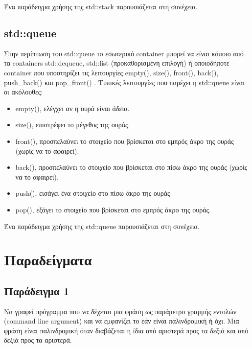 Ένα παράδειγμα χρήσης της std::stack παρουσιάζεται στη συνέχεια.






\subsection{std::queue}
Στην περίπτωση του std::queue το εσωτερικό container μπορεί να είναι κάποιο από τα containers std::dequeue, std::list (προκαθορισμένη επιλογή) ή οποιοδήποτε container που υποστηρίζει τις λειτουργίες empty(), size(), front(), back(), push\_back() και pop\_front() \cite{scobey_stl_queue}. Τυπικές λειτουργίες που παρέχει η std::queue είναι οι ακόλουθες:
\begin{itemize}[noitemsep]
\item empty(), ελέγχει αν η ουρά είναι άδεια.
\item size(), επιστρέφει το μέγεθος της ουράς.
\item front(), προσπελαύνει το στοιχείο που βρίσκεται στο εμπρός άκρο της ουράς (χωρίς να το αφαιρεί).
\item back(), προσπελαύνει το στοιχείο που βρίσκεται στο πίσω άκρο της ουράς (χωρίς να το αφαιρεί).
\item push(), εισάγει ένα στοιχείο στο πίσω άκρο της ουράς
\item pop(), εξάγει το στοιχείο που βρίσκεται στο εμπρός άκρο της ουράς.
\end{itemize}

Ένα παράδειγμα χρήσης της std::queue παρουσιάζεται στη συνέχεια.




\section{Παραδείγματα}
\subsection{Παράδειγμα 1}
Να γραφεί πρόγραμμα που να δέχεται μια φράση ως παράμετρο γραμμής εντολών (command line argument) και να εμφανίζει το εάν είναι παλινδρομική ή όχι. Μια φράση είναι παλινδρομική όταν διαβάζεται η ίδια από αριστερά προς τα δεξιά και από δεξιά προς τα αριστερά.


